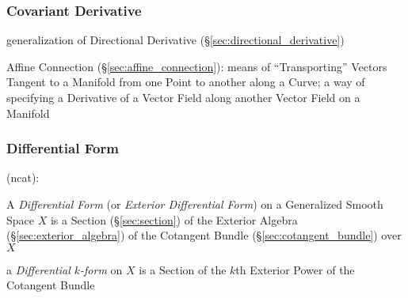 \subsubsection{Covariant Derivative}\label{sec:covariant_derivative}

generalization of Directional Derivative (\S\ref{sec:directional_derivative})

\fist Affine Connection (\S\ref{sec:affine_connection}): means of
``Transporting'' Vectors Tangent to a Manifold from one Point to another along
a Curve; a way of specifying a Derivative of a Vector Field along another
Vector Field on a Manifold



\subsubsection{Differential Form}\label{sec:differential_form}

(ncat):

A \emph{Differential Form} (or \emph{Exterior Differential Form}) on a
Generalized Smooth Space $X$ is a Section (\S\ref{sec:section}) of the Exterior
Algebra (\S\ref{sec:exterior_algebra}) of the Cotangent Bundle
(\S\ref{sec:cotangent_bundle}) over $X$

a \emph{Differential $k$-form} on $X$ is a Section of the $k$th Exterior Power
of the Cotangent Bundle

